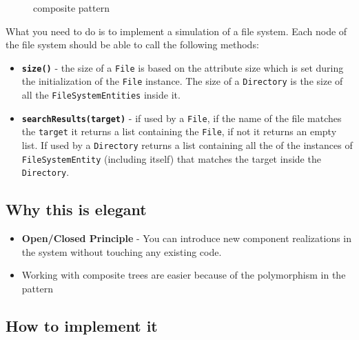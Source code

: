 \begin{figure}
\centering
{}
\caption{composite pattern}
\end{figure}

What you need to do is to implement a simulation of a file system. Each
node of the file system should be able to call the following methods:

\begin{itemize}
\tightlist
\item
  \textbf{\texttt{size()}} - the size of a \texttt{File} is based on the
  attribute size which is set during the initialization of the
  \texttt{File} instance. The size of a \texttt{Directory} is the size
  of all the \texttt{FileSystemEntities} inside it.
\item
  \textbf{\texttt{searchResults(target)}} - if used by a \texttt{File},
  if the name of the file matches the \texttt{target} it returns a list
  containing the \texttt{File}, if not it returns an empty list. If used
  by a \texttt{Directory} returns a list containing all the of the
  instances of \texttt{FileSystemEntity} (including itself) that matches
  the target inside the \texttt{Directory}.
\end{itemize}

\subsection{Why this is
elegant}\label{structural-patterns.md__why-this-is-elegant-2}

\begin{itemize}
\tightlist
\item
  \textbf{Open/Closed Principle} - You can introduce new component
  realizations in the system without touching any existing code.
\item
  Working with composite trees are easier because of the polymorphism in
  the pattern
\end{itemize}

\subsection{How to implement
it}\label{structural-patterns.md__how-to-implement-it-2}

